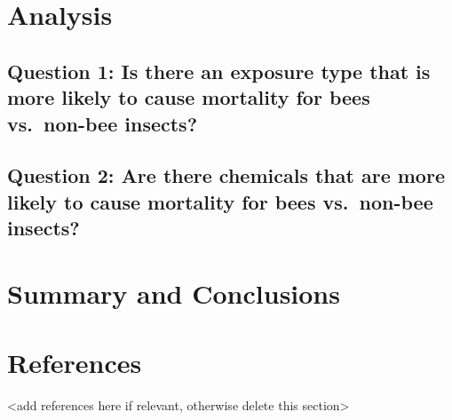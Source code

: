 \documentclass[
  12pt,
]{article}
\begin{document}
\newpage

\hypertarget{analysis}{%
\section{Analysis}\label{analysis}}

\hypertarget{question-1-is-there-an-exposure-type-that-is-more-likely-to-cause-mortality-for-bees-vs.-non-bee-insects}{%
\subsection{Question 1: Is there an exposure type that is more likely to
cause mortality for bees vs.~non-bee
insects?}\label{question-1-is-there-an-exposure-type-that-is-more-likely-to-cause-mortality-for-bees-vs.-non-bee-insects}}

\hypertarget{question-2-are-there-chemicals-that-are-more-likely-to-cause-mortality-for-bees-vs.-non-bee-insects}{%
\subsection{Question 2: Are there chemicals that are more likely to
cause mortality for bees vs.~non-bee
insects?}\label{question-2-are-there-chemicals-that-are-more-likely-to-cause-mortality-for-bees-vs.-non-bee-insects}}

\newpage

\hypertarget{summary-and-conclusions}{%
\section{Summary and Conclusions}\label{summary-and-conclusions}}

\newpage

\hypertarget{references}{%
\section{References}\label{references}}

\textless add references here if relevant, otherwise delete this
section\textgreater{}
\end{document}
